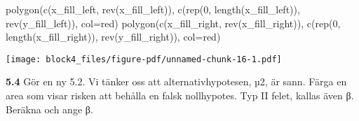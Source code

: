 \documentclass[
  letterpaper,
  DIV=11,
  numbers=noendperiod]{scrartcl}
\newenvironment{Shaded}{\begin{snugshade}}{\end{snugshade}}
\newcommand{\AttributeTok}[1]{\textcolor[rgb]{0.40,0.45,0.13}{#1}}
\newcommand{\DecValTok}[1]{\textcolor[rgb]{0.68,0.00,0.00}{#1}}
\newcommand{\FunctionTok}[1]{\textcolor[rgb]{0.28,0.35,0.67}{#1}}
\newcommand{\NormalTok}[1]{\textcolor[rgb]{0.00,0.23,0.31}{#1}}
\newcommand{\StringTok}[1]{\textcolor[rgb]{0.13,0.47,0.30}{#1}}
\begin{document}
\begin{Shaded}
\begin{Highlighting}[]
\FunctionTok{polygon}\NormalTok{(}\FunctionTok{c}\NormalTok{(x\_fill\_left, }\FunctionTok{rev}\NormalTok{(x\_fill\_left)),}
\FunctionTok{c}\NormalTok{(}\FunctionTok{rep}\NormalTok{(}\DecValTok{0}\NormalTok{, }\FunctionTok{length}\NormalTok{(x\_fill\_left)), }\FunctionTok{rev}\NormalTok{(y\_fill\_left)), }\AttributeTok{col=}\StringTok{\textquotesingle{}red\textquotesingle{}}\NormalTok{)}
\FunctionTok{polygon}\NormalTok{(}\FunctionTok{c}\NormalTok{(x\_fill\_right, }\FunctionTok{rev}\NormalTok{(x\_fill\_right)),}
\FunctionTok{c}\NormalTok{(}\FunctionTok{rep}\NormalTok{(}\DecValTok{0}\NormalTok{, }\FunctionTok{length}\NormalTok{(x\_fill\_right)), }\FunctionTok{rev}\NormalTok{(y\_fill\_right)), }\AttributeTok{col=}\StringTok{\textquotesingle{}red\textquotesingle{}}\NormalTok{)}
\end{Highlighting}
\end{Shaded}

\texttt{[image: block4\_files/figure-pdf/unnamed-chunk-16-1.pdf]}

\textbf{5.4} Gör en ny 5.2. Vi tänker oss att alternativhypotesen, µ2,
är sann. Färga en area som visar risken att behålla en falsk
nollhypotes. Typ II felet, kallas även β. Beräkna och ange β.
\end{document}
